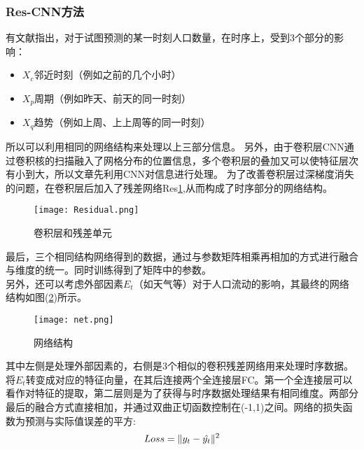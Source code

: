 \subsubsection*{Res-CNN方法}
有文献\cite{Zhang2016Deep}指出，对于试图预测的某一时刻人口数量，在时序上，受到3个部分的影响：
\begin{itemize}
	\item $X_c$邻近时刻（例如之前的几个小时）
	\item $X_p$周期（例如昨天、前天的同一时刻）
	\item $X_q$趋势（例如上周、上上周等的同一时刻）
\end{itemize}
所以可以利用相同的网络结构来处理以上三部分信息。
\indent 另外，由于卷积层CNN通过卷积核的扫描融入了网格分布的位置信息，多个卷积层的叠加又可以使特征层次有小到大，所以文章先利用CNN对信息进行处理。
为了改善卷积层过深梯度消失的问题，在卷积层后加入了残差网络Res\ref{fig:2.5},从而构成了时序部分的网络结构。
\begin{figure}[ht]
\centering
\texttt{[image: Residual.png]}
\caption{卷积层和残差单元}
\label{fig:2.5}
\end{figure}
最后，三个相同结构网络得到的数据，通过与参数矩阵相乘再相加的方式进行融合与维度的统一。同时训练得到了矩阵中的参数。
\\
\indent 另外，还可以考虑外部因素$E_t$（如天气等）对于人口流动的影响，其最终的网络结构如图(\ref{fig:2.6})所示。
\begin{figure}[ht]
\centering
\texttt{[image: net.png]}
\caption{网络结构}
\label{fig:2.6}
\end{figure}
其中左侧是处理外部因素的，右侧是3个相似的卷积残差网络用来处理时序数据。将$E_t$转变成对应的特征向量，在其后连接两个全连接层FC。第一个全连接层可以看作对特征的提取，第二层则是为了获得与时序数据处理结果有相同维度。两部分最后的融合方式直接相加，并通过双曲正切函数控制在(-1,1)之间。网络的损失函数为预测与实际值误差的平方:
\begin{equation}
Loss = \Arrowvert y_t - \hat{y_t} \Arrowvert^2
\end{equation}
